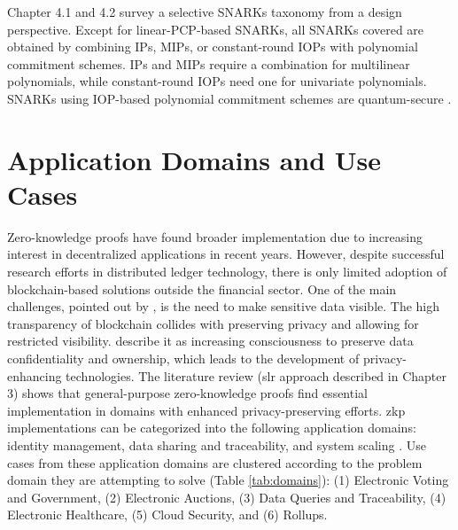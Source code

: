Chapter 4.1 and 4.2 survey a selective SNARKs taxonomy from a design perspective. Except for linear-PCP-based SNARKs, all SNARKs covered are obtained by combining IPs, MIPs, or constant-round IOPs with polynomial commitment schemes. IPs and MIPs require a combination for multilinear polynomials, while constant-round IOPs need one for univariate polynomials. SNARKs using IOP-based polynomial commitment schemes are quantum-secure \citep{Thaler}.

\section{Application Domains and Use Cases}
Zero-knowledge proofs have found broader implementation due to increasing interest in decentralized applications in recent years. However, despite successful research efforts in distributed ledger technology, there is only limited adoption of blockchain-based solutions outside the financial sector. One of the main challenges, pointed out by \citet{SedlmeirTransparencyChallenge}, is the need to make sensitive data visible. The high transparency of blockchain collides with preserving privacy and allowing for restricted visibility. \citet{Godden} describe it as increasing consciousness to preserve data confidentiality and ownership, which leads to the development of privacy-enhancing technologies. The literature review (\acrshort{slr} approach described in Chapter 3) shows that general-purpose zero-knowledge proofs find essential implementation in domains with enhanced privacy-preserving efforts. \acrshort{zkp} implementations can be categorized into the following application domains: identity management, data sharing and traceability, and system scaling \citep{PipeZK, chen2022review, morais2019survey}. Use cases from these application domains are clustered according to the problem domain they are attempting to solve (Table \ref{tab:domains}): (1) Electronic Voting and Government, (2) Electronic Auctions, (3) Data Queries and Traceability, (4) Electronic Healthcare, (5) Cloud Security, and (6) Rollups.

